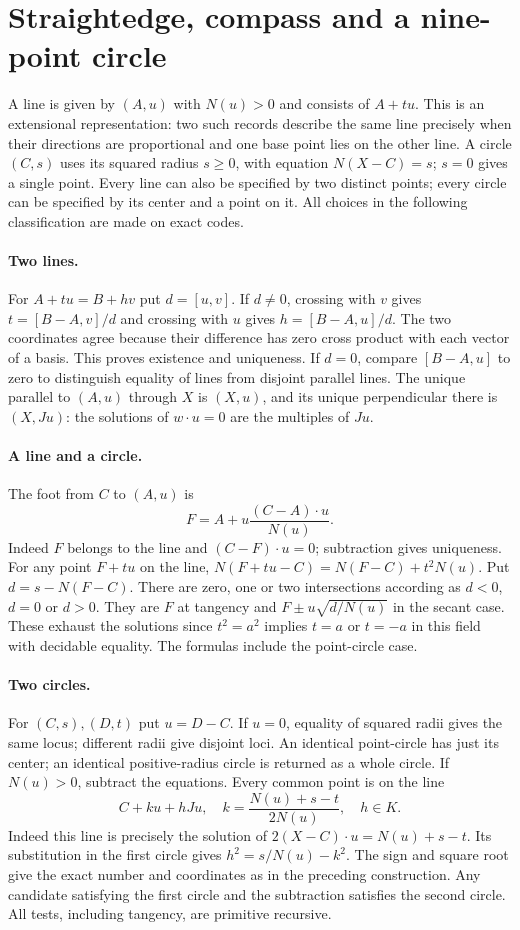 \section{Straightedge, compass and a nine-point circle}
\label{sec:constructions}
A line is given by $(A,u)$ with $N(u)>0$ and consists of $A+tu$.
This is an extensional representation: two such records describe the same
line precisely when their directions are proportional and one base point
lies on the other line. A circle $(C,s)$ uses its squared radius $s\ge0$,
with equation $N(X-C)=s$; $s=0$ gives a single point.
Every line can also be specified by two distinct points; every
circle can be specified by its center and a point on it.
All choices in the following classification are made on exact codes.

\paragraph{Two lines.}
For $A+tu=B+hv$ put $d=[u,v]$. If $d\ne0$, crossing with $v$
gives $t=[B-A,v]/d$ and crossing with $u$ gives $h=[B-A,u]/d$.
The two coordinates agree because their difference has zero cross
product with each vector of a basis. This proves existence and uniqueness.
If $d=0$, compare $[B-A,u]$ to zero to distinguish equality of lines
from disjoint parallel lines. The unique parallel to $(A,u)$ through $X$
is $(X,u)$, and its unique perpendicular there is $(X,Ju)$:
the solutions of $w\cdot u=0$ are the multiples of $Ju$.

\paragraph{A line and a circle.}
The foot from $C$ to $(A,u)$ is
\[
        F=A+u\frac{(C-A)\cdot u}{N(u)} .
\]
Indeed $F$ belongs to the line and $(C-F)\cdot u=0$; subtraction
gives uniqueness. For any point $F+tu$ on the line,
$N(F+tu-C)=N(F-C)+t^2N(u)$. Put $d=s-N(F-C)$.
There are zero, one or two intersections according as $d<0$, $d=0$
or $d>0$. They are $F$ at tangency and
$F\pm u\sqrt{d/N(u)}$ in the secant case. These exhaust the
solutions since $t^2=a^2$ implies $t=a$ or $t=-a$ in this field with decidable equality.
The formulas include the point-circle case.

\paragraph{Two circles.}
For $(C,s),(D,t)$ put $u=D-C$. If $u=0$, equality of squared radii
gives the same locus; different radii give disjoint loci. An identical
point-circle has just its center; an identical positive-radius circle
is returned as a whole circle. If $N(u)>0$, subtract the equations.
Every common point is on the line
\[
 C+k u+hJu,\quad k=\frac{N(u)+s-t}{2N(u)},\quad h\in K.
\]
Indeed this line is precisely the solution of
$2(X-C)\cdot u=N(u)+s-t$. Its substitution in the first circle gives
$h^2=s/N(u)-k^2$. The sign and square root give the exact number and
coordinates as in the preceding construction. Any candidate satisfying
the first circle and the subtraction satisfies the second circle.
All tests, including tangency, are primitive recursive.

